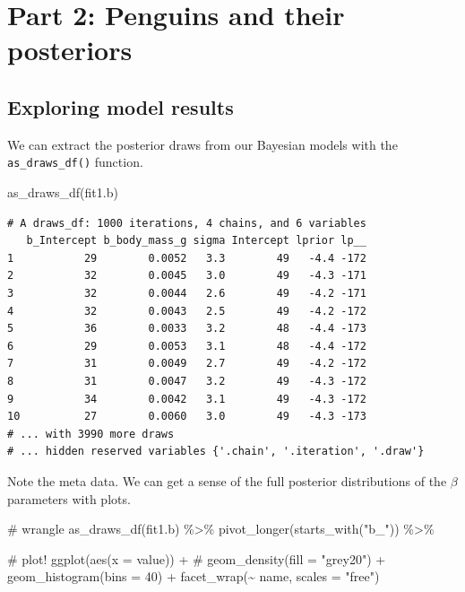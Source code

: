 \documentclass[
  letterpaper,
  DIV=11,
  numbers=noendperiod]{scrartcl}
\newenvironment{Shaded}{\begin{snugshade}}{\end{snugshade}}
\newcommand{\AttributeTok}[1]{\textcolor[rgb]{0.40,0.45,0.13}{#1}}
\newcommand{\CommentTok}[1]{\textcolor[rgb]{0.37,0.37,0.37}{#1}}
\newcommand{\DecValTok}[1]{\textcolor[rgb]{0.68,0.00,0.00}{#1}}
\newcommand{\FunctionTok}[1]{\textcolor[rgb]{0.28,0.35,0.67}{#1}}
\newcommand{\NormalTok}[1]{\textcolor[rgb]{0.00,0.23,0.31}{#1}}
\newcommand{\SpecialCharTok}[1]{\textcolor[rgb]{0.37,0.37,0.37}{#1}}
\newcommand{\StringTok}[1]{\textcolor[rgb]{0.13,0.47,0.30}{#1}}
\begin{document}
\section{Part 2: Penguins and their
posteriors}\label{part-2-penguins-and-their-posteriors}

\subsection{Exploring model results}\label{exploring-model-results}

We can extract the posterior draws from our Bayesian models with the
\texttt{as\_draws\_df()} function.

\begin{Shaded}
\begin{Highlighting}[]
\FunctionTok{as\_draws\_df}\NormalTok{(fit1.b)}
\end{Highlighting}
\end{Shaded}

\begin{verbatim}
# A draws_df: 1000 iterations, 4 chains, and 6 variables
   b_Intercept b_body_mass_g sigma Intercept lprior lp__
1           29        0.0052   3.3        49   -4.4 -172
2           32        0.0045   3.0        49   -4.3 -171
3           32        0.0044   2.6        49   -4.2 -171
4           32        0.0043   2.5        49   -4.2 -172
5           36        0.0033   3.2        48   -4.4 -173
6           29        0.0053   3.1        48   -4.4 -172
7           31        0.0049   2.7        49   -4.2 -172
8           31        0.0047   3.2        49   -4.3 -172
9           34        0.0042   3.1        49   -4.3 -172
10          27        0.0060   3.0        49   -4.3 -173
# ... with 3990 more draws
# ... hidden reserved variables {'.chain', '.iteration', '.draw'}
\end{verbatim}

Note the meta data. We can get a sense of the full posterior
distributions of the \(\beta\) parameters with plots.

\begin{Shaded}
\begin{Highlighting}[]
\CommentTok{\# wrangle}
\FunctionTok{as\_draws\_df}\NormalTok{(fit1.b) }\SpecialCharTok{\%\textgreater{}\%} 
  \FunctionTok{pivot\_longer}\NormalTok{(}\FunctionTok{starts\_with}\NormalTok{(}\StringTok{"b\_"}\NormalTok{)) }\SpecialCharTok{\%\textgreater{}\%} 
  
  \CommentTok{\# plot!}
  \FunctionTok{ggplot}\NormalTok{(}\FunctionTok{aes}\NormalTok{(}\AttributeTok{x =}\NormalTok{ value)) }\SpecialCharTok{+} 
  \CommentTok{\# geom\_density(fill = "grey20") +}
  \FunctionTok{geom\_histogram}\NormalTok{(}\AttributeTok{bins =} \DecValTok{40}\NormalTok{) }\SpecialCharTok{+}
  \FunctionTok{facet\_wrap}\NormalTok{(}\SpecialCharTok{\textasciitilde{}}\NormalTok{ name, }\AttributeTok{scales =} \StringTok{"free"}\NormalTok{)}
\end{Highlighting}
\end{Shaded}
\end{document}
